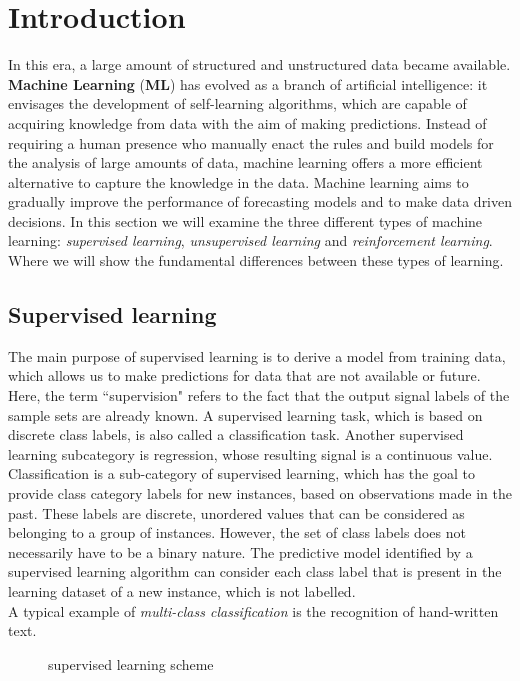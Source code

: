 \section{Introduction}
\label{sec:intro}
In this era, a large amount of structured and unstructured data became available.
\textbf{Machine Learning} (\textbf{ML}) has evolved as a branch of artificial
intelligence: it envisages the development of self-learning algorithms, which are
capable of acquiring knowledge from data with the aim of making predictions.
Instead of requiring a human presence who manually enact the rules and
build models for the analysis of large amounts of data, machine learning offers
a more efficient alternative to capture the knowledge in the data. Machine learning
aims to gradually improve the performance of forecasting models and
to make data driven decisions.
In this section we will examine the three different types of machine learning:
\emph{supervised learning}, \emph{unsupervised learning} and
\emph{reinforcement learning}.
Where we will show the fundamental differences between these types of
learning.\cite{raschka2016machine}
%
\subsection{Supervised learning}
\label{subsec:supervised-learnig}
The main purpose of supervised learning is to derive a model from 
training data, which allows us to make predictions for data that are not
available or future.
Here, the term ``supervision" refers to the fact that the output signal labels of the
sample sets are already known.
A supervised learning task, which is based on discrete class labels, is also called a
classification task.
Another supervised learning subcategory is regression, whose resulting
signal is a continuous value.
Classification is a sub-category of supervised learning, which has the goal to
provide class category labels for new instances, based on observations made in
the past.
These labels are discrete, unordered values ​​that can be considered as
belonging to a group of instances.
However, the set of class labels does not necessarily have to be a binary
nature.
The predictive model identified by a supervised learning algorithm can consider
each class label that is present in the learning dataset of a new instance, which
is not labelled.\\
A typical example of \emph{multi-class classification} is the recognition of
hand-written text.\cite{raschka2016machine}
%
\begin{figure}[!h]
\centering
\resizebox{\linewidth}{!}{}
\caption{supervised learning scheme} 
\label{fig:supervised-learning-scheme}
\end{figure}
%
